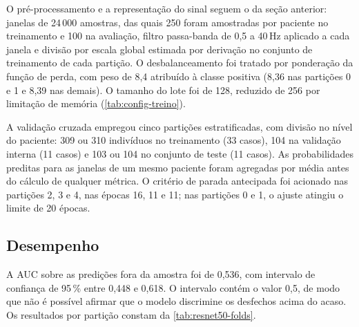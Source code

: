 O pré-processamento e a representação do sinal seguem o da seção anterior:
janelas de 24\,000 amostras, das quais 250 foram amostradas por paciente no
treinamento e 100 na avaliação, filtro passa-banda de 0,5 a 40\,Hz aplicado a
cada janela e divisão por escala global estimada por derivação no conjunto de
treinamento de cada partição. O desbalanceamento foi tratado por ponderação da
função de perda, com peso de 8,4 atribuído à classe positiva (8,36 nas
partições 0 e 1 e 8,39 nas demais). O tamanho do lote foi de 128, reduzido de
256 por limitação de memória (\autoref{tab:config-treino}).

A validação cruzada empregou cinco partições estratificadas, com divisão no
nível do paciente: 309 ou 310 indivíduos no treinamento (33 casos), 104 na
validação interna (11 casos) e 103 ou 104 no conjunto de teste (11 casos). As
probabilidades preditas para as janelas de um mesmo paciente foram agregadas
por média antes do cálculo de qualquer métrica. O critério de parada
antecipada foi acionado nas partições 2, 3 e 4, nas épocas 16, 11 e 11; nas
partições 0 e 1, o ajuste atingiu o limite de 20 épocas.

\subsection{Desempenho}
\label{subsec:desempenho-resnet50}

A \gls{AUC} sobre as predições fora da amostra foi de 0,536, com intervalo de
confiança de 95\,\% entre 0,448 e 0,618. O intervalo contém o valor 0,5, de
modo que não é possível afirmar que o modelo discrimine os desfechos acima do
acaso. Os resultados por partição constam da \autoref{tab:resnet50-folds}.

